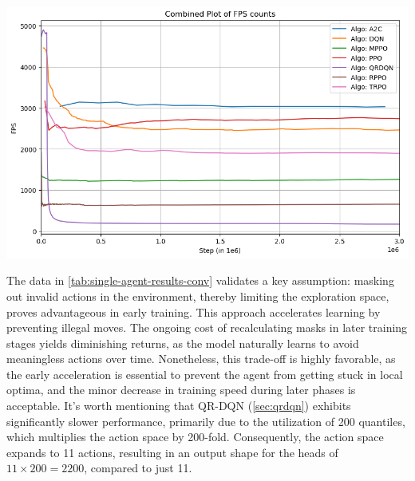 \begin{minipage}[htbp]{0.45\textwidth}
    \centering
    \includegraphics[width=\linewidth]{images/results_singleunit/mean_fps_total.png}
    \captionsetup{justification=justified, singlelinecheck=false, width=1\linewidth, labelfont=bf} 
    \label{fig:mean-sps-total}
\end{minipage}


\noindent The data in \textcolor{deepblue}{\autoref{tab:single-agent-results-conv}} validates a key assumption: masking out invalid actions in the environment, thereby limiting the exploration space, proves advantageous in early training. This approach accelerates learning by preventing illegal moves. The ongoing cost of recalculating masks in later training stages yields diminishing returns, as the model naturally learns to avoid meaningless actions over time. Nonetheless, this trade-off is highly favorable, as the early acceleration is essential to prevent the agent from getting stuck in local optima, and the minor decrease in training speed during later phases is acceptable. It's worth mentioning that QR-DQN (\autoref{sec:qrdqn}) exhibits significantly slower performance, primarily due to the utilization of 200 quantiles, which multiplies the action space by 200-fold. Consequently, the action space expands to 11 actions, resulting in an output shape for the heads of $11 \times 200 = 2200$, compared to just 11.


